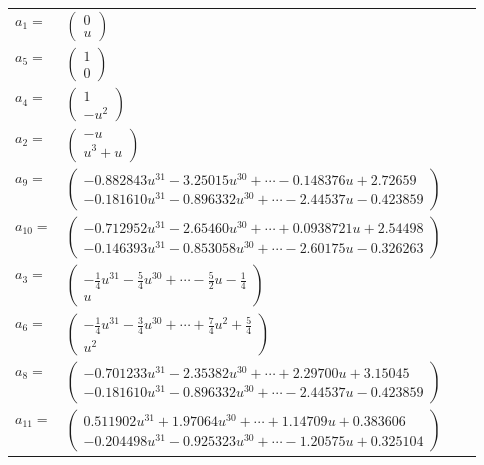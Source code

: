 \documentclass[1p]{elsarticle_modified}
\theoremstyle{definition}
\begin{document}
\begin{tabular}{m{7pt} m{180pt} m{7pt} m{180pt} }
\flushright $a_{1}=$&$\begin{pmatrix}0\\u\end{pmatrix}$ \\
\flushright $a_{5}=$&$\begin{pmatrix}1\\0\end{pmatrix}$ \\
\flushright $a_{4}=$&$\begin{pmatrix}1\\- u^2\end{pmatrix}$ \\
\flushright $a_{2}=$&$\begin{pmatrix}- u\\u^3+u\end{pmatrix}$ \\
\flushright $a_{9}=$&$\begin{pmatrix}-0.882843 u^{31}-3.25015 u^{30}+\cdots-0.148376 u+2.72659\\-0.181610 u^{31}-0.896332 u^{30}+\cdots-2.44537 u-0.423859\end{pmatrix}$ \\
\flushright $a_{10}=$&$\begin{pmatrix}-0.712952 u^{31}-2.65460 u^{30}+\cdots+0.0938721 u+2.54498\\-0.146393 u^{31}-0.853058 u^{30}+\cdots-2.60175 u-0.326263\end{pmatrix}$ \\
\flushright $a_{3}=$&$\begin{pmatrix}-\frac{1}{4} u^{31}-\frac{5}{4} u^{30}+\cdots-\frac{5}{2} u-\frac{1}{4}\\u\end{pmatrix}$ \\
\flushright $a_{6}=$&$\begin{pmatrix}-\frac{1}{4} u^{31}-\frac{3}{4} u^{30}+\cdots+\frac{7}{4} u^2+\frac{5}{4}\\u^2\end{pmatrix}$ \\
\flushright $a_{8}=$&$\begin{pmatrix}-0.701233 u^{31}-2.35382 u^{30}+\cdots+2.29700 u+3.15045\\-0.181610 u^{31}-0.896332 u^{30}+\cdots-2.44537 u-0.423859\end{pmatrix}$ \\
\flushright $a_{11}=$&$\begin{pmatrix}0.511902 u^{31}+1.97064 u^{30}+\cdots+1.14709 u+0.383606\\-0.204498 u^{31}-0.925323 u^{30}+\cdots-1.20575 u+0.325104\end{pmatrix}$ \\

\end{tabular}
\end{document}
